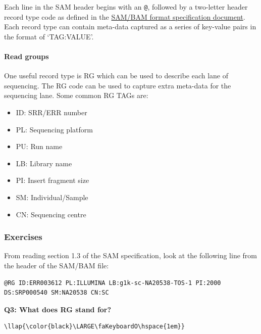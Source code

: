 \documentclass[11pt]{article}
\providecommand{\tightlist}{%
      \setlength{\itemsep}{0pt}\setlength{\parskip}{0pt}}
\begin{document}
Each line in the SAM header begins with an \texttt{@}, followed by a
two-letter header record type code as defined in the
\href{https://samtools.github.io/hts-specs/SAMv1.pdf}{SAM/BAM format
specification document}. Each record type can contain meta-data captured
as a series of key-value pairs in the format of `TAG:VALUE'.

\hypertarget{read-groups}{%
\paragraph{Read groups}\label{read-groups}}

One useful record type is RG which can be used to describe each lane of
sequencing. The RG code can be used to capture extra meta-data for the
sequencing lane. Some common RG TAGs are:

\begin{itemize}
\tightlist
\item
  ID: SRR/ERR number
\item
  PL: Sequencing platform
\item
  PU: Run name
\item
  LB: Library name
\item
  PI: Insert fragment size
\item
  SM: Individual/Sample
\item
  CN: Sequencing centre
\end{itemize}

    \hypertarget{exercises}{%
\subsubsection{Exercises}\label{exercises}}

From reading section 1.3 of the SAM specification, look at the following
line from the header of the SAM/BAM file:

\begin{verbatim}
@RG ID:ERR003612 PL:ILLUMINA LB:g1k-sc-NA20538-TOS-1 PI:2000 DS:SRP000540 SM:NA20538 CN:SC
\end{verbatim}

\textbf{Q3: What does RG stand for?}

\begin{terminalinput}
\begin{Verbatim}[commandchars=\\\{\}]
\llap{\color{black}\LARGE\faKeyboardO\hspace{1em}}
\end{Verbatim}
\end{terminalinput}
\end{document}
